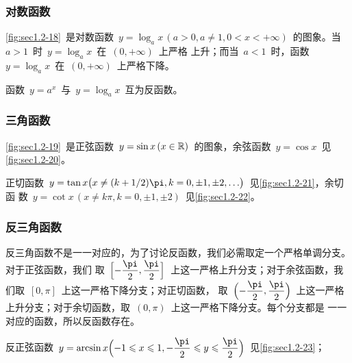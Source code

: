 \subsubsection{对数函数}

\ref{fig:sec1.2-18}~是对数函数~$y=\log_ax\,(a>0,a\neq1,0<x<+\infty)$~的图象。当~$a>1$~时~$y=\log_ax$~在~$(0,+\infty)$~上严格
上升；而当~$a<1$~时，函数~$y=\log_ax$~在~$(0,+\infty)$~上严格下降。

函数~$y=a^x$~与~$y=\log_ax$~互为反函数。

\subsubsection{三角函数}

\ref{fig:sec1.2-19}~是正弦函数~$y=\sin x\,(x\in\mathbb{R})$~的图象，余弦函数~$y=\cos x$~见\ref{fig:sec1.2-20}。

正切函数~$y=\tan x\Parenb{x\neq (k+1/2)\pi,k=0,\pm1,\pm2,\dotsc}$~见\ref{fig:sec1.2-21}，余切函
数~$y=\cot x\,(x\neq k\pi,k=0,\pm1,\pm2)$~见\ref{fig:sec1.2-22}。

\begin{figure}
\begin{floatrow}
\begin{minipage}{.4\hsize}
          {\somefigure}
          {\somefigure}
\end{minipage}\qquad
\begin{minipage}{.4\hsize}
          {\somefigure}
          {\somefigure}
\end{minipage}
\end{floatrow}
\end{figure}

\subsubsection{反三角函数}

反三角函数不是一一对应的，为了讨论反函数，我们必需取定一个严格单调分支。对于正弦函数，我们
取~$\Brack[\Big]{-\dfrac\pi2,\dfrac\pi2}$~上这一严格上升分支；对于余弦函数，我们取~$[0,\pi]$~上这一严格下降分支；对正切函数，%
取~$\Paren[\Big]{-\dfrac\pi2,\dfrac\pi2}$~上这一严格上升分支；对于余切函数，取~$(0,\pi)$~上这一严格下降分支。每个分支都是
一一对应的函数，所以反函数存在。

反正弦函数~$y=\arcsin x\Paren[\Big]{-1\leq x\leq1,-\dfrac\pi2\leq y\leq\dfrac\pi2}$~见\ref{fig:sec1.2-23}；


